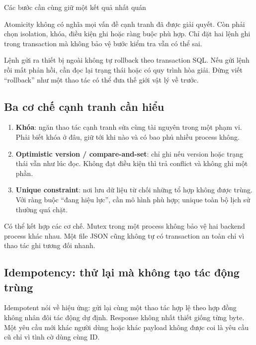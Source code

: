   {Các bước cần cùng giữ một kết quả nhất quán}

Atomicity không có nghĩa mọi vấn đề cạnh tranh đã được giải quyết. Còn phải chọn isolation, khóa, điều kiện ghi hoặc ràng buộc phù hợp. Chỉ đặt hai lệnh ghi trong transaction mà không bảo vệ bước kiểm tra vẫn có thể sai.

Lệnh gửi ra thiết bị ngoài không tự rollback theo transaction SQL. Nếu gửi lệnh rồi mất phản hồi, cần đọc lại trạng thái hoặc có quy trình hòa giải. Đừng viết ``rollback'' như một thao tác có thể đưa thế giới vật lý về trước.

\subsection{Ba cơ chế cạnh tranh cần hiểu}
\begin{enumerate}
  \item \textbf{Khóa}: ngăn thao tác cạnh tranh sửa cùng tài nguyên trong một phạm vi. Phải biết khóa ở đâu, giữ tới khi nào và có bao phủ nhiều process không.
  \item \textbf{Optimistic version / compare-and-set}: chỉ ghi nếu version hoặc trạng thái vẫn như lúc đọc. Không đạt điều kiện thì trả conflict và không ghi một phần.
  \item \textbf{Unique constraint}: nơi lưu dữ liệu từ chối những tổ hợp không được trùng. Với ràng buộc ``đang hiệu lực'', cần mô hình phù hợp; unique toàn bộ lịch sử thường quá chặt.
\end{enumerate}
Có thể kết hợp các cơ chế. Mutex trong một process không bảo vệ hai backend process khác nhau. Một file JSON cũng không tự có transaction an toàn chỉ vì thao tác ghi tương đối nhanh.

\subsection{Idempotency: thử lại mà không tạo tác động trùng}
Idempotent nói về hiệu ứng: gửi lại cùng một thao tác hợp lệ theo hợp đồng không nhân đôi tác động dự định. Response không nhất thiết giống từng byte. Một yêu cầu mới khác người dùng hoặc khác payload không được coi là yêu cầu cũ chỉ vì tình cờ dùng cùng ID.

